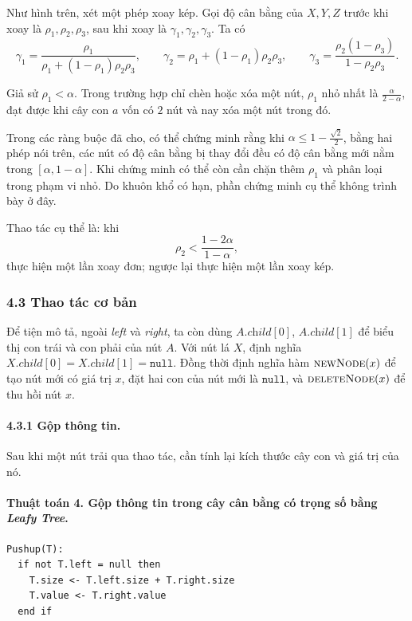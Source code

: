 \documentclass[11pt]{article}
\begin{document}
Như hình trên, xét một phép xoay kép. Gọi độ cân bằng của \(X,Y,Z\) trước khi
xoay là \(\rho_1,\rho_2,\rho_3\), sau khi xoay là
\(\gamma_1,\gamma_2,\gamma_3\). Ta có
\[
  \gamma_1=\frac{\rho_1}{\rho_1+(1-\rho_1)\rho_2\rho_3},
  \qquad
  \gamma_2=\rho_1+(1-\rho_1)\rho_2\rho_3,
  \qquad
  \gamma_3=\frac{\rho_2(1-\rho_3)}{1-\rho_2\rho_3}.
\]

Giả sử \(\rho_1<\alpha\). Trong trường hợp chỉ chèn hoặc xóa một nút,
\(\rho_1\) nhỏ nhất là \(\frac{\alpha}{2-\alpha}\), đạt được khi cây con
\(a\) vốn có \(2\) nút và nay xóa một nút trong đó.

Trong các ràng buộc đã cho, có thể chứng minh rằng khi
\(\alpha\le 1-\frac{\sqrt2}{2}\), bằng hai phép nói trên, các nút có độ cân
bằng bị thay đổi đều có độ cân bằng mới nằm trong \([\alpha,1-\alpha]\). Khi
chứng minh có thể còn cần chặn thêm \(\rho_1\) và phân loại trong phạm vi nhỏ.
Do khuôn khổ có hạn, phần chứng minh cụ thể không trình bày ở đây.

Thao tác cụ thể là: khi
\[
  \rho_2<\frac{1-2\alpha}{1-\alpha},
\]
thực hiện một lần xoay đơn; ngược lại thực hiện một lần xoay kép.

\subsubsection*{4.3 Thao tác cơ bản}

Để tiện mô tả, ngoài \textit{left} và \textit{right}, ta còn dùng
\(A.\textit{child}[0]\), \(A.\textit{child}[1]\) để biểu thị con trái và con
phải của nút \(A\). Với nút lá \(X\), định nghĩa
\(X.\textit{child}[0]=X.\textit{child}[1]=\texttt{null}\). Đồng thời định nghĩa
hàm \(\textsc{newNode}(x)\) để tạo nút mới có giá trị \(x\), đặt hai con của
nút mới là \(\texttt{null}\), và \(\textsc{deleteNode}(x)\) để thu hồi nút
\(x\).

\paragraph{4.3.1 Gộp thông tin.}
Sau khi một nút trải qua thao tác, cần tính lại kích thước cây con và giá trị
của nó.

\paragraph{Thuật toán 4. Gộp thông tin trong cây cân bằng có trọng số bằng \emph{Leafy Tree}.}
\begin{verbatim}
Pushup(T):
  if not T.left = null then
    T.size <- T.left.size + T.right.size
    T.value <- T.right.value
  end if
\end{verbatim}
\end{document}
